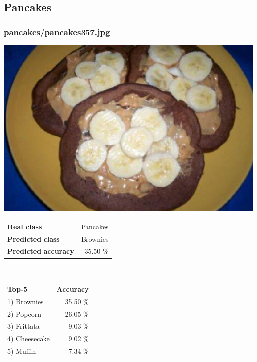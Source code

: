\subsection{Pancakes}
    
\subsubsection{pancakes/pancakes357.jpg}

\begin{minipage}[t]{0.4\textwidth}
	\vspace{0pt}
	\includegraphics[width=\linewidth]{images/evaluation-images/pancakes/pancakes357.jpg}
\end{minipage}
\hfill
\begin{minipage}[t]{0.5\textwidth}
	\vspace{0pt}\raggedright
	\begin{tabularx}{\textwidth}{X r}
		\small \textbf{Real class} & \small Pancakes\\
		\small \textbf{Predicted class} & \small Brownies\\
		\small \textbf{Predicted accuracy} & \small 35.50 \%
    \end{tabularx}\\
    
    \vspace{6pt}
	\begin{tabularx}{\textwidth}{X r}
        \small \textbf{Top-5} & \small \textbf{Accuracy} \\
        \hline
		\small 1) Brownies & \small 35.50 \%\\\small 2) Popcorn & \small 26.05 \%\\\small 3) Frittata & \small 9.03 \%\\\small 4) Cheesecake & \small 9.02 \%\\\small 5) Muffin & \small 7.34 \%
    \end{tabularx}
\end{minipage}
    
